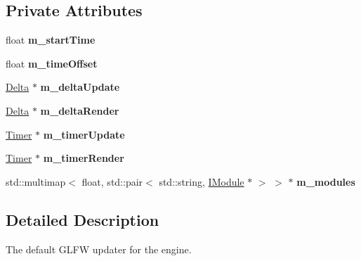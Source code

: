 \subsection*{Private Attributes}
\begin{DoxyCompactItemize}
\item 
\mbox{\label{class_flounder_1_1_glfw_updater_a8ae53ee8df4d4756a30bf4a6aa9a9599}} 
float {\bfseries m\+\_\+start\+Time}
\item 
\mbox{\label{class_flounder_1_1_glfw_updater_acc15e1e06a311aec4f820fc48b5a1ee1}} 
float {\bfseries m\+\_\+time\+Offset}
\item 
\mbox{\label{class_flounder_1_1_glfw_updater_add3762db57822cc92b3b905636bb6f34}} 
\hyperlink{class_flounder_1_1_delta}{Delta} $\ast$ {\bfseries m\+\_\+delta\+Update}
\item 
\mbox{\label{class_flounder_1_1_glfw_updater_a16f131f90be109707ae6d1058ffe89e4}} 
\hyperlink{class_flounder_1_1_delta}{Delta} $\ast$ {\bfseries m\+\_\+delta\+Render}
\item 
\mbox{\label{class_flounder_1_1_glfw_updater_a4e24a1685deff4fab1026a589f06a810}} 
\hyperlink{class_flounder_1_1_timer}{Timer} $\ast$ {\bfseries m\+\_\+timer\+Update}
\item 
\mbox{\label{class_flounder_1_1_glfw_updater_a2ad5e21497ea9a2a5130b13e1806f4b1}} 
\hyperlink{class_flounder_1_1_timer}{Timer} $\ast$ {\bfseries m\+\_\+timer\+Render}
\item 
\mbox{\label{class_flounder_1_1_glfw_updater_a84f3cd60ddd8ede43f251b564b7a9526}} 
std\+::multimap$<$ float, std\+::pair$<$ std\+::string, \hyperlink{class_flounder_1_1_i_module}{I\+Module} $\ast$ $>$ $>$ $\ast$ {\bfseries m\+\_\+modules}
\end{DoxyCompactItemize}


\subsection{Detailed Description}
The default G\+L\+FW updater for the engine. 



